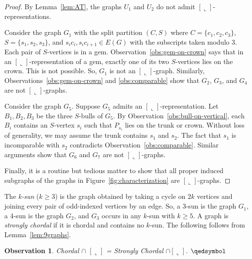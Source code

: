 \documentclass[11pt,3p,times]{elsarticle}
\newenvironment{myproof}{\begin{proof}}{\end{proof}}
\newcommand{\La}{\ensuremath{\llcorner}} \newcommand{\Lb}{\ensuremath{\ulcorner}} \newcommand{\Lc}{\ensuremath{\lrcorner}} \newcommand{\Ld}{\ensuremath{\urcorner}}
\newcommand{\proofBox}{\hfill $\qedsymbol$}
\newtheorem{observation}[theorem]{Observation}
\begin{document}
\begin{myproof}
By Lemma~\ref{lem:AT}, the graphs $U_1$ and $U_2$ do not
admit $[\La]$-representations.

Consider the graph $G_1$ with the
split partition $(C,S)$ where $C=\{c_1, c_2, c_3\}$, $S=\{s_1,
s_2, s_3 \}$, and $s_i c_i, s_i c_{i+1} \in E(G)$ with the
subscripts taken modulo 3. Each pair of $S$-vertices is in a gem.
Observation~\ref{obs:gem-on-crown} says that in an $[\La]$-representation
of a gem, exactly one of its two $S$-vertices lies on the crown.  This
is not possible. So, $G_1$ is not an $[\La]$-graph. Similarly,
Observations~\ref{obs:gem-on-crown} and
\ref{obs:comparable} show that $G_2$, $G_3$, and
$G_4$ are not $[\La]$-graphs.

Consider the graph $G_5$. Suppose
$G_5$ admits an $[\La]$-representation. Let $B_1, B_2, B_3$ be the
three $S$-bulls of $G_5$. By
Observation~\ref{obs:bull-on-vertical}, each $B_i$ contains an
$S$-vertex $s_i$ such that $P_{s_i}$ lies on the trunk or crown.
Without loss of generality, we may assume the trunk contains $s_1$
and $s_2$. The fact that $s_1$ is incomparable with $s_2$
contradicts Observation~\ref{obs:comparable}. Similar arguments
show that $G_6$ and $G_7$ are not $[\La]$-graphs.

Finally, it is a
routine but tedious matter to show that all proper induced
subgraphs of the graphs in Figure~\ref{fig:characterization} are
$[\La]$-graphs.
\end{myproof}


The {\em k-sun} ($k \geq 3$) is the graph obtained by taking a
cycle on $2k$ vertices and joining every pair of odd-indexed vertices by an edge.
So, a 3-sun is the graph $G_1$, a 4-sun is the graph $G_2$, and
$G_3$ occurs in any $k$-sun with $k \geq 5$. A graph is {\em
strongly chordal} if it is chordal and contains no $k$-sun. The
following follows from Lemma~\ref{lem:9graphs}.
\begin{observation}
Chordal $\cap$ $[\La]$ = Strongly Chordal $\cap [\La]$. \proofBox
\end{observation}
\end{document}
